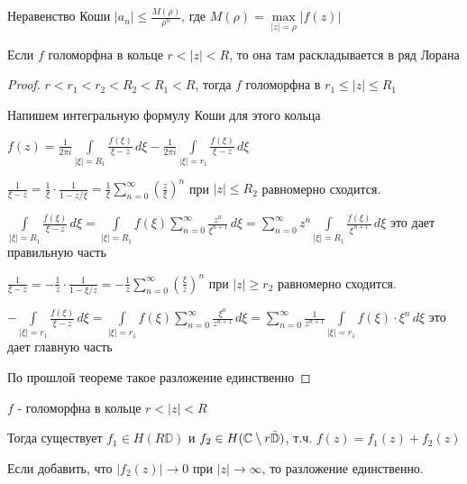 \begin{remark}\thmslashn
	
	Неравенство Коши $|a_n| \leqslant \frac{M(\rho)}{\rho^n}$, где $M(\rho) = \max\limits_{|z| = \rho}{|f(z)|}$
	
\end{remark}

\begin{theorem}[Лорана]\thmslashn
	
	Если $f$ голоморфна в кольце $r < |z| < R$, то она там раскладывается в ряд Лорана

\end{theorem}

\begin{proof}\thmslashn
	
	$r < r_1 < r_2 < R_2 < R_1 < R$, тогда $f$ голоморфна в $r_1 \leqslant |z| \leqslant R_1$
	
	Напишем интегральную формулу Коши для этого кольца 
	
	$f(z) = \frac{1}{2\pi i} \int\limits_{|\xi| = R_1} \frac{f(\xi)}{\xi - z}\, d\xi - \frac{1}{2\pi i} \int\limits_{|\xi| = r_1} \frac{f(\xi)}{\xi - z}\, d\xi$
	
	$\frac{1}{\xi - z} = \frac{1}{\xi} \cdot \frac{1}{1-z/\xi} = \frac{1}{\xi} \sum\limits_{n=0}^\infty \left( \frac{z}{\xi} \right)^n$ при $|z| \leqslant R_2$ равномерно сходится.
	
	$ \int\limits_{|\xi| = R_1} \frac{f(\xi)}{\xi - z}\, d\xi =  \int\limits_{|\xi| = R_1} f(\xi) \sum\limits_{n=0}^\infty \frac{z^n}{\xi^{n+1}}\, d\xi = \sum\limits_{n=0}^\infty z^n \int\limits_{|\xi| = R_1} \frac{f(\xi)}{\xi^{n+1}}\, d\xi$ это дает правильную часть
	
	$\frac{1}{\xi - z} = -\frac{1}{z} \cdot \frac{1}{1-\xi/z} = -\frac{1}{z} \sum\limits_{n=0}^\infty \left( \frac{\xi}{z} \right)^n$ при $|z| \geqslant r_2$ равномерно сходится.
	
	$ -\int\limits_{|\xi| = r_1} \frac{f(\xi)}{\xi - z}\, d\xi =  \int\limits_{|\xi| = r_1} f(\xi) \sum\limits_{n=0}^\infty \frac{\xi^n}{z^{n+1}}\, d\xi = \sum\limits_{n=0}^\infty \frac{1}{z^{n+1}} \int\limits_{|\xi| = r_1} f(\xi) \cdot \xi^{n}\, d\xi$ это дает главную часть

	По прошлой теореме такое разложение единственно	
	
\end{proof}

\begin{theorem}\thmslashn
	
	$f$ - голоморфна в кольце $r < |z| < R$
	
	Тогда существует $f_1 \in H(R\mathbb{D})$ и $f_2 \in H(\mathbb{C} \setminus r \tilde{\mathbb{D}})$, т.ч. $f(z) = f_1(z) + f_2(z)$
	
	Если добавить, что $|f_2(z)| \to 0$ при $|z| \to \infty$, то разложение единственно.
	
\end{theorem}

